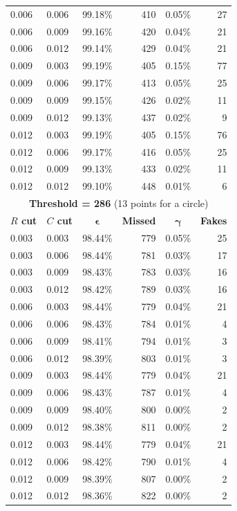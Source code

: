 \documentclass[11pt,twoside]{scrreprt}
\begin{document}
\begin{longtable}{llcrcr}
0.006 & 0.006 & 99.18\% & 410 & 0.05\% & 27 \\
0.006 & 0.009 & 99.16\% & 420 & 0.04\% & 21 \\
0.006 & 0.012 & 99.14\% & 429 & 0.04\% & 21 \\
0.009 & 0.003 & 99.19\% & 405 & 0.15\% & 77 \\
0.009 & 0.006 & 99.17\% & 413 & 0.05\% & 25 \\
0.009 & 0.009 & 99.15\% & 426 & 0.02\% & 11 \\
0.009 & 0.012 & 99.13\% & 437 & 0.02\% & 9 \\
0.012 & 0.003 & 99.19\% & 405 & 0.15\% & 76 \\
0.012 & 0.006 & 99.17\% & 416 & 0.05\% & 25 \\
0.012 & 0.009 & 99.13\% & 433 & 0.02\% & 11 \\
0.012 & 0.012 & 99.10\% & 448 & 0.01\% & 6 \\
\bottomrule
\toprule
\multicolumn{6}{c}{\textbf{Threshold = 286} (13 points for a circle)}\\
\midrule
\textbf{$R$ cut} & \textbf{$C$ cut} & $\boldsymbol{\epsilon}$ & \textbf{Missed} & $\boldsymbol{\gamma}$ & \textbf{Fakes} \\
\midrule
0.003 & 0.003 & 98.44\% & 779 & 0.05\% & 25 \\
0.003 & 0.006 & 98.44\% & 781 & 0.03\% & 17 \\
0.003 & 0.009 & 98.43\% & 783 & 0.03\% & 16 \\
0.003 & 0.012 & 98.42\% & 789 & 0.03\% & 16 \\
0.006 & 0.003 & 98.44\% & 779 & 0.04\% & 21 \\
0.006 & 0.006 & 98.43\% & 784 & 0.01\% & 4 \\
0.006 & 0.009 & 98.41\% & 794 & 0.01\% & 3 \\
0.006 & 0.012 & 98.39\% & 803 & 0.01\% & 3 \\
0.009 & 0.003 & 98.44\% & 779 & 0.04\% & 21 \\
0.009 & 0.006 & 98.43\% & 787 & 0.01\% & 4 \\
0.009 & 0.009 & 98.40\% & 800 & 0.00\% & 2 \\
0.009 & 0.012 & 98.38\% & 811 & 0.00\% & 2 \\
0.012 & 0.003 & 98.44\% & 779 & 0.04\% & 21 \\
0.012 & 0.006 & 98.42\% & 790 & 0.01\% & 4 \\
0.012 & 0.009 & 98.39\% & 807 & 0.00\% & 2 \\
0.012 & 0.012 & 98.36\% & 822 & 0.00\% & 2 \\
\bottomrule
\end{longtable}
\end{document}

